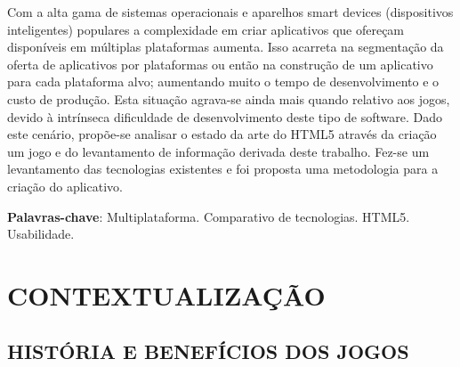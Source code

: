 \documentclass{article}
\begin{document}
Com a alta gama de sistemas operacionais e aparelhos smart devices (dispositivos inteligentes) populares a complexidade em criar aplicativos que ofereçam disponíveis em múltiplas plataformas aumenta. Isso acarreta na segmentação da oferta de aplicativos por plataformas ou então na construção de um aplicativo para cada plataforma alvo; aumentando muito o tempo de desenvolvimento e o custo de produção. Esta situação agrava-se ainda mais quando relativo aos jogos, devido à intrínseca dificuldade de desenvolvimento deste tipo de software. Dado este cenário, propõe-se analisar o estado da arte do HTML5 através da criação um jogo e do levantamento de informação derivada deste trabalho.  Fez-se um levantamento das tecnologias existentes e foi proposta uma metodologia para a criação do aplicativo.

\textbf{Palavras-chave}: Multiplataforma. Comparativo de tecnologias. HTML5. Usabilidade.

\newpage

\listoffigures
\listoftables
\newpage

\tableofcontents
\newpage

\section{CONTEXTUALIZAÇÃO}
\subsection{HISTÓRIA E BENEFÍCIOS DOS JOGOS}
\end{document}
